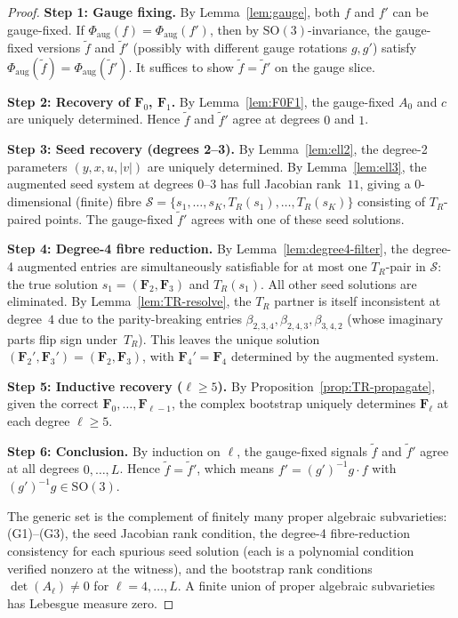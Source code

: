\documentclass[11pt]{article}
\newcommand{\SO}{\mathrm{SO}}
\begin{document}
\begin{proof}
\textbf{Step 1: Gauge fixing.}
By Lemma~\ref{lem:gauge}, both $f$ and $f'$ can be gauge-fixed.
If $\Phi_{\mathrm{aug}}(f) = \Phi_{\mathrm{aug}}(f')$, then by
$\SO(3)$-invariance, the gauge-fixed versions $\tilde{f}$ and $\tilde{f}'$
(possibly with different gauge rotations $g, g'$) satisfy
$\Phi_{\mathrm{aug}}(\tilde{f}) = \Phi_{\mathrm{aug}}(\tilde{f}')$.
It suffices to show $\tilde{f} = \tilde{f}'$ on the gauge slice.

\medskip
\textbf{Step 2: Recovery of $\mathbf{F}_0$, $\mathbf{F}_1$.}
By Lemma~\ref{lem:F0F1}, the gauge-fixed $A_0$ and $c$ are uniquely
determined. Hence $\tilde{f}$ and $\tilde{f}'$ agree at degrees $0$ and $1$.

\medskip
\textbf{Step 3: Seed recovery (degrees 2--3).}
By Lemma~\ref{lem:ell2}, the degree-2 parameters $(y, x, u, |v|)$
are uniquely determined.
By Lemma~\ref{lem:ell3}, the augmented seed system at degrees $0$--$3$
has full Jacobian rank~$11$, giving a $0$-dimensional (finite) fibre
$\mathcal{S} = \{s_1, \ldots, s_K, T_R(s_1), \ldots, T_R(s_K)\}$
consisting of $T_R$-paired points.
The gauge-fixed $\tilde{f}'$ agrees with one of these seed solutions.

\medskip
\textbf{Step 4: Degree-4 fibre reduction.}
By Lemma~\ref{lem:degree4-filter}, the degree-4 augmented entries
are simultaneously satisfiable for at most one $T_R$-pair in
$\mathcal{S}$: the true solution $s_1 = (\mathbf{F}_2, \mathbf{F}_3)$ and
$T_R(s_1)$.  All other seed solutions are eliminated.
By Lemma~\ref{lem:TR-resolve}, the $T_R$ partner is itself inconsistent
at degree~$4$ due to the parity-breaking entries
$\beta_{2,3,4}, \beta_{2,4,3}, \beta_{3,4,2}$
(whose imaginary parts flip sign under~$T_R$).
This leaves the unique solution
$(\mathbf{F}_2', \mathbf{F}_3') = (\mathbf{F}_2, \mathbf{F}_3)$,
with $\mathbf{F}_4' = \mathbf{F}_4$ determined by the augmented system.

\medskip
\textbf{Step 5: Inductive recovery ($\ell \ge 5$).}
By Proposition~\ref{prop:TR-propagate}, given the correct
$\mathbf{F}_0, \ldots, \mathbf{F}_{\ell-1}$, the complex bootstrap
uniquely determines $\mathbf{F}_\ell$ at each degree $\ell \ge 5$.

\medskip
\textbf{Step 6: Conclusion.}
By induction on $\ell$, the gauge-fixed signals $\tilde{f}$ and $\tilde{f}'$
agree at all degrees $0, \ldots, L$.
Hence $\tilde{f} = \tilde{f}'$, which means $f' = (g')^{-1} g \cdot f$
with $(g')^{-1} g \in \SO(3)$.

The generic set is the complement of finitely many proper algebraic
subvarieties: (G1)--(G3), the seed Jacobian rank condition, the
degree-4 fibre-reduction consistency for each spurious seed solution
(each is a polynomial condition verified nonzero at the witness),
and the bootstrap rank conditions $\det(A_\ell) \ne 0$ for
$\ell = 4, \ldots, L$.
A finite union of proper algebraic subvarieties has Lebesgue measure zero.
\end{proof}
\end{document}
